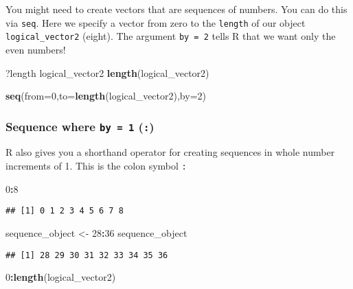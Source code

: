 \documentclass[]{article}
\newenvironment{Shaded}{\begin{snugshade}}{\end{snugshade}}
\newcommand{\KeywordTok}[1]{\textcolor[rgb]{0.13,0.29,0.53}{\textbf{#1}}}
\newcommand{\DataTypeTok}[1]{\textcolor[rgb]{0.13,0.29,0.53}{#1}}
\newcommand{\DecValTok}[1]{\textcolor[rgb]{0.00,0.00,0.81}{#1}}
\newcommand{\StringTok}[1]{\textcolor[rgb]{0.31,0.60,0.02}{#1}}
\newcommand{\OperatorTok}[1]{\textcolor[rgb]{0.81,0.36,0.00}{\textbf{#1}}}
\newcommand{\NormalTok}[1]{#1}
\begin{document}
You might need to create vectors that are sequences of numbers. You can
do this via \texttt{seq}. Here we specify a vector from zero to the
\texttt{length} of our object \texttt{logical\_vector2} (eight). The
argument \texttt{by\ =\ 2} tells R that we want only the even numbers!

\begin{Shaded}
\begin{Highlighting}[]
\NormalTok{?length}
\NormalTok{logical_vector2}
\KeywordTok{length}\NormalTok{(logical_vector2)}

\KeywordTok{seq}\NormalTok{(}\DataTypeTok{from=}\DecValTok{0}\NormalTok{,}\DataTypeTok{to=}\KeywordTok{length}\NormalTok{(logical_vector2),}\DataTypeTok{by=}\DecValTok{2}\NormalTok{)}
\end{Highlighting}
\end{Shaded}

\subsubsection{\texorpdfstring{Sequence where \texttt{by\ =\ 1}
(\texttt{:})}{Sequence where by = 1 (:)}}\label{sequence-where-by-1}

R also gives you a shorthand operator for creating sequences in whole
number increments of 1. This is the colon symbol \texttt{:}

\begin{Shaded}
\begin{Highlighting}[]
\DecValTok{0}\OperatorTok{:}\DecValTok{8}
\end{Highlighting}
\end{Shaded}

\begin{verbatim}
## [1] 0 1 2 3 4 5 6 7 8
\end{verbatim}

\begin{Shaded}
\begin{Highlighting}[]
\NormalTok{sequence_object <-}\StringTok{ }\DecValTok{28}\OperatorTok{:}\DecValTok{36}
\NormalTok{sequence_object }
\end{Highlighting}
\end{Shaded}

\begin{verbatim}
## [1] 28 29 30 31 32 33 34 35 36
\end{verbatim}

\begin{Shaded}
\begin{Highlighting}[]
\DecValTok{0}\OperatorTok{:}\KeywordTok{length}\NormalTok{(logical_vector2)}
\end{Highlighting}
\end{Shaded}
\end{document}
